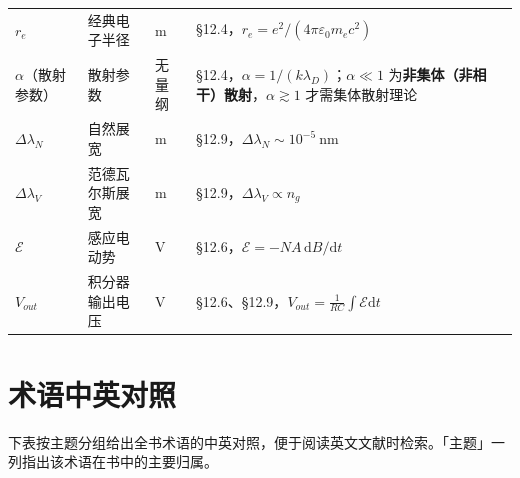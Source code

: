 \documentclass[12pt,a4paper,openany,oneside]{book}
\newcommand{\diff}{\mathrm{d}}
\newcommand{\eps}{\varepsilon}
\begin{document}
{\begin{longtable}{@{}p{1.8cm}p{4.4cm}p{3.3cm}p{5.1cm}@{}}
$r_e$ & 经典电子半径 & m & \S 12.4，$r_e = e^2/(4\pi\eps_0m_ec^2)$ \\
$\alpha$（散射参数） & 散射参数 & 无量纲 & \S 12.4，$\alpha = 1/(k\lambda_D)$；$\alpha\ll1$ 为\textbf{非集体（非相干）散射}，$\alpha\gtrsim1$ 才需集体散射理论 \\
$\Delta\lambda_N$ & 自然展宽 & m & \S 12.9，$\Delta\lambda_N \sim 10^{-5}\ \mathrm{nm}$ \\
$\Delta\lambda_V$ & 范德瓦尔斯展宽 & m & \S 12.9，$\Delta\lambda_V \propto n_g$ \\
$\mathcal{E}$ & 感应电动势 & V & \S 12.6，$\mathcal{E} = -N A\,\diff B/\diff t$ \\
$V_{out}$ & 积分器输出电压 & V & \S 12.6、\S 12.9，$V_{out} = \frac{1}{RC}\int\mathcal{E}\diff t$ \\
\end{longtable}
}

\section{术语中英对照}

下表按主题分组给出全书术语的中英对照，便于阅读英文文献时检索。「主题」一列指出该术语在书中的主要归属。
\end{document}
